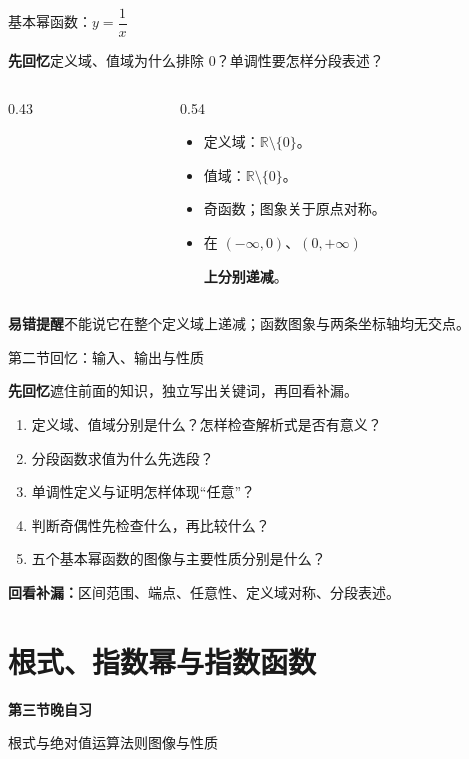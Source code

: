 \documentclass[UTF8,10pt,aspectratio=169]{ctexbeamer}
\newcommand{\Recall}[1]{\par\noindent\textcolor{KnowledgeBlue}{\textbf{先回忆}\quad #1}\par\vspace{0.3cm}}
\newcommand{\Pitfall}[1]{\par\vspace{0.22cm}\noindent\textbf{易错提醒}\quad #1\par}
\newcommand{\Session}[3]{\section{#2}\begin{frame}\vspace{0.7cm}\begin{center}{\Large\bfseries 第#1节晚自习}\par\vspace{0.5cm}{\LARGE\bfseries #2}\par\vspace{0.6cm}#3\end{center}\end{frame}}
\begin{document}
\begin{frame}[t]{基本幂函数：$y=\dfrac1x$}
\large
\Recall{定义域、值域为什么排除 $0$？单调性要怎样分段表述？}
\pause
\begin{columns}[c,onlytextwidth]
\begin{column}{0.43\textwidth}
\centering
{}
\end{column}
\begin{column}{0.54\textwidth}
\begin{itemize}
  \item 定义域：$\mathbb R\setminus\{0\}$。
  \item 值域：$\mathbb R\setminus\{0\}$。
  \item 奇函数；图象关于原点对称。
  \item 在 $(-\infty,0)$、$(0,+\infty)$\par\textbf{上分别递减}。
\end{itemize}
\end{column}
\end{columns}
\Pitfall{不能说它在整个定义域上递减；函数图象与两条坐标轴均无交点。}
\end{frame}


\begin{frame}[t]{第二节回忆：输入、输出与性质}
\Recall{遮住前面的知识，独立写出关键词，再回看补漏。}
\begin{enumerate}
\item 定义域、值域分别是什么？怎样检查解析式是否有意义？
\item 分段函数求值为什么先选段？
\item 单调性定义与证明怎样体现“任意”？
\item 判断奇偶性先检查什么，再比较什么？
\item 五个基本幂函数的图像与主要性质分别是什么？
\end{enumerate}
\pause
\par\vspace{0.2cm}\textbf{回看补漏：}区间范围、端点、任意性、定义域对称、分段表述。
\end{frame}

\Session{三}{根式、指数幂与指数函数}{根式与绝对值\quad 运算法则\quad 图像与性质}
\end{document}
